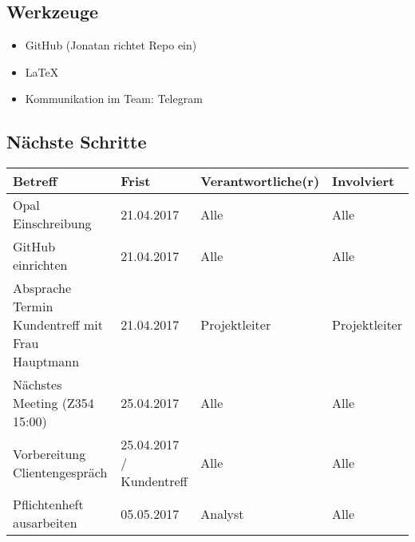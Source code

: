\documentclass{scrartcl}
\begin{document}
\subsection{Werkzeuge}
\begin{itemize}
\item GitHub (Jonatan richtet Repo ein)
\item \LaTeX
\item Kommunikation im Team: Telegram
\end{itemize}
\subsection{Nächste Schritte}
\begin{tabular}{L{.249} L{.2} L{.25} L{.25}}
Betreff & Frist & Verantwortliche(r) & Involviert\\\hline
Opal Einschreibung & 21.04.2017 & Alle & Alle\\
GitHub einrichten & 21.04.2017 & Alle & Alle\\
Absprache Termin Kundentreff mit Frau Hauptmann & 21.04.2017 & Projektleiter & Projektleiter\\
Nächstes Meeting (Z354 15:00) & 25.04.2017 & Alle & Alle\\
Vorbereitung Clientengespräch & 25.04.2017 / Kundentreff & Alle & Alle\\
Pflichtenheft ausarbeiten & 05.05.2017 & Analyst & Alle\\
\end{tabular}
\end{document}
